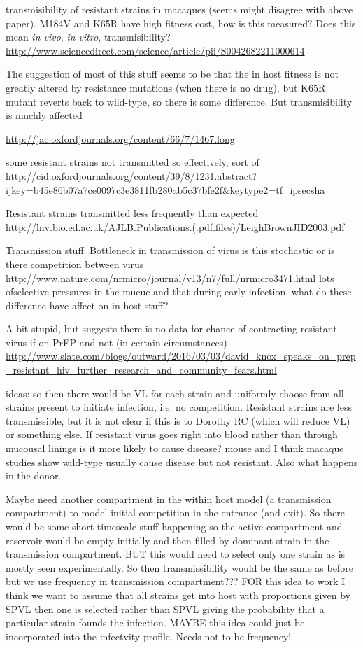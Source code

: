 \documentclass[DIV=15]{scrartcl}
\begin{document}
transmisibility of resistant strains in macaques (seems might disagree with above paper). M184V and K65R have high fitness cost, how is this measured? Does this mean \textit{in vivo}, \textit{in vitro}, transmisibility?
\url{http://www.sciencedirect.com/science/article/pii/S0042682211000614}

The suggestion of most of this stuff seems to be that the in host fitness is not greatly altered by resistance mutations (when there is no drug), but    K65R mutant reverts back to wild-type, so there is some difference. But transmisibility is muchly affected \cite{chateau2013}

\url{http://jac.oxfordjournals.org/content/66/7/1467.long}



some resistant strains not transmitted so effectively, sort of
\url{http://cid.oxfordjournals.org/content/39/8/1231.abstract?ijkey=b45e86b07a7ce0097c3e3811fb280ab5c37bfe2f&keytype2=tf_ipsecsha}


Resistant strains transmitted  less frequently than expected
\url{http://hiv.bio.ed.ac.uk/AJLB.Publications.(.pdf.files)/LeighBrownJID2003.pdf}


Transmission stuff. Bottleneck in transmission of virus is this stochastic or is there competition between virus
\url{http://www.nature.com/nrmicro/journal/v13/n7/full/nrmicro3471.html}
lots ofselective pressures in the mucuc and that during early infection, what do these difference have affect on in host stuff?

A bit stupid, but suggests there is no data  for chance of contracting resistant virus if on PrEP and not (in certain circumstances) 
\url{http://www.slate.com/blogs/outward/2016/03/03/david_knox_speaks_on_prep_resistant_hiv_further_research_and_community_fears.html}


ideas: so then there would be VL for each strain and uniformly choose from all strains present to initiate infection, i.e. no competition. Resistant strains are less transmissible, but it is not clear if this is to Dorothy RC (which will reduce VL) or something else. If resistant virus goes right into blood rather than through mucousal linings is it more likely to cause disease? mouse and I think macaque studies show wild-type usually cause disease but not resistant. Also what happens in the donor. 

Maybe need another compartment in the within host model (a transmission compartment) to model initial competition in the entrance (and exit). So there would be some short timescale stuff happening so the active compartment and reservoir would be empty initially and then filled by dominant strain in the transmission compartment. BUT this would need to select only one strain as is mostly  seen  experimentally. So then transmissibility would be the same as before but we use frequency in transmission compartment???
FOR this idea to work I think we want to assume that all strains get into host with proportions given by SPVL then one is selected rather than SPVL giving the probability that a particular strain founds the infection. MAYBE this idea could just be incorporated into the  infectvity profile. Needs not to be frequency!
\end{document}
